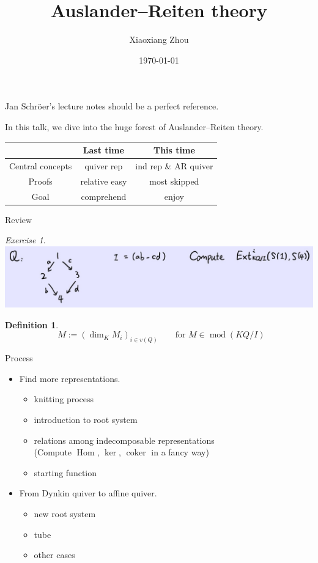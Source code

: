 \documentclass[pdf]{beamer}
\title{Auslander--Reiten theory}
\author{Xiaoxiang Zhou}
\institute[Bonn uni]{Universität Bonn}
\date{\today} %
\numberwithin{equation}{section}
\theoremstyle{plain}
\newtheorem{defn}[theorem]{Definition}
\theoremstyle{plain}
\theoremstyle{remark}
\newtheorem{ex}[theorem]{Exercise}
\DeclareMathOperator{\Ker}{\operatorname{ker}}
\DeclareMathOperator{\coker}{\operatorname{coker}}
\DeclareMathOperator{\Mod}{\operatorname{mod}}
\DeclareMathOperator{\Hom}{\operatorname{Hom}}
\DeclareMathOperator{\dvct}{\underline{\operatorname{dim}}}
\begin{document}
\begin{frame}
	\titlepage
	Jan Schröer's lecture notes should be a perfect reference. 
\end{frame}
\begin{frame}
In this talk, we dive into the huge forest of Auslander--Reiten theory.
\vspace{1cm}
\begin{table}[]
\begin{tabular}{c|c|c}
\hline
                 & Last time     & This time            \\ \hline
Central concepts & quiver rep    & ind rep \& AR quiver \\ \hline
Proofs           & relative easy & most skipped         \\ \hline
Goal             & comprehend    & enjoy                \\ \hline
\end{tabular}
\end{table}
\end{frame}

\begin{frame}{Review}
\begin{ex}
\centering
    \includegraphics[scale=0.45]{figure/fig1.jpg}
    \vspace{2.5cm}
\end{ex}
\begin{defn}
$$\dvct M:= \left( \dim_K M_i \right)_{i \in v(Q)} \qquad \text{for } M \in \Mod(KQ/I)$$
\end{defn}
\end{frame}
\begin{frame}[fragile]{Process}

\begin{itemize}
	\item Find more representations.
	\begin{itemize}
	\item knitting process
	\item introduction to root system
	\item relations among indecomposable representations\\
	(Compute $\Hom$, $\Ker$, $\coker$ in a fancy way) 
	\item starting function 
	\end{itemize}
	\vspace{0.5cm}
	\item From Dynkin quiver to affine quiver.
	\begin{itemize}
	\item new root system
	\item tube
	\item other cases
	\end{itemize}
\end{itemize}

\end{frame}
\end{document}
